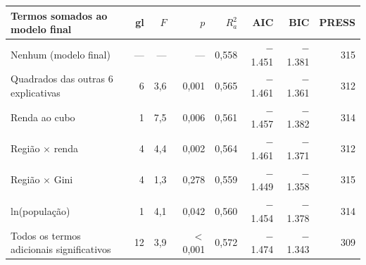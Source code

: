 \begin{tabular}{@{}lrrrrrrr@{}}
\toprule
\textbf{Termos somados ao modelo final} & \textbf{gl} & \textbf{$F$} & \textbf{$p$} & \textbf{$R^2_a$} & \textbf{AIC} & \textbf{BIC} & \textbf{PRESS}\\
\midrule
Nenhum (modelo final) & --- & --- & --- & 0,558 & $-$1.451 & $-$1.381 & 315\\
Quadrados das outras 6 explicativas & 6 & 3,6 & 0,001 & 0,565 & $-$1.461 & $-$1.361 & 312\\
Renda ao cubo & 1 & 7,5 & 0,006 & 0,561 & $-$1.457 & $-$1.382 & 314\\
Região $\times$ renda & 4 & 4,4 & 0,002 & 0,564 & $-$1.461 & $-$1.371 & 312\\
Região $\times$ Gini & 4 & 1,3 & 0,278 & 0,559 & $-$1.449 & $-$1.358 & 315\\
ln(população) & 1 & 4,1 & 0,042 & 0,560 & $-$1.454 & $-$1.378 & 314\\
Todos os termos adicionais significativos & 12 & 3,9 & $<$0,001 & 0,572 & $-$1.474 & $-$1.343 & 309\\
\bottomrule
\end{tabular}
